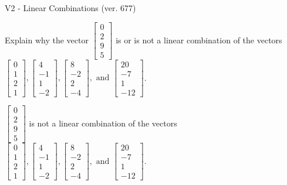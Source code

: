 \begin{exercise}
  \begin{exerciseTitle}V2 - Linear Combinations (ver. 677)\end{exerciseTitle}
  \begin{exerciseStatement}
    Explain why the vector \(\left[\begin{array}{c}
0 \\
2 \\
9 \\
5
\end{array}\right]\)  is or is not a linear 
	combination of the vectors \(\left[\begin{array}{c}
0 \\
1 \\
2 \\
1
\end{array}\right] , \left[\begin{array}{c}
4 \\
-1 \\
1 \\
-2
\end{array}\right] , \left[\begin{array}{c}
8 \\
-2 \\
2 \\
-4
\end{array}\right] , \text{ and } \left[\begin{array}{c}
20 \\
-7 \\
1 \\
-12
\end{array}\right]\).
	


  \end{exerciseStatement}
  \begin{exerciseAnswer}
   \(\left[\begin{array}{c}
0 \\
2 \\
9 \\
5
\end{array}\right]\) 
  	 is not  
	a linear combination of the vectors \(\left[\begin{array}{c}
0 \\
1 \\
2 \\
1
\end{array}\right] , \left[\begin{array}{c}
4 \\
-1 \\
1 \\
-2
\end{array}\right] , \left[\begin{array}{c}
8 \\
-2 \\
2 \\
-4
\end{array}\right] , \text{ and } \left[\begin{array}{c}
20 \\
-7 \\
1 \\
-12
\end{array}\right]\).


\end{exerciseAnswer}
\end{exercise}
